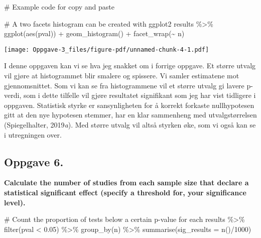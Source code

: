 \documentclass[
  letterpaper,
  DIV=11,
  numbers=noendperiod]{scrreprt}
\newenvironment{Shaded}{\begin{snugshade}}{\end{snugshade}}
\newcommand{\AttributeTok}[1]{\textcolor[rgb]{0.40,0.45,0.13}{#1}}
\newcommand{\CommentTok}[1]{\textcolor[rgb]{0.37,0.37,0.37}{#1}}
\newcommand{\DecValTok}[1]{\textcolor[rgb]{0.68,0.00,0.00}{#1}}
\newcommand{\FloatTok}[1]{\textcolor[rgb]{0.68,0.00,0.00}{#1}}
\newcommand{\FunctionTok}[1]{\textcolor[rgb]{0.28,0.35,0.67}{#1}}
\newcommand{\NormalTok}[1]{\textcolor[rgb]{0.00,0.23,0.31}{#1}}
\newcommand{\SpecialCharTok}[1]{\textcolor[rgb]{0.37,0.37,0.37}{#1}}
\begin{document}
\begin{Shaded}
\begin{Highlighting}[]
\CommentTok{\# Example code for copy and paste}

\CommentTok{\# A two facets histogram can be created with ggplot2}
\NormalTok{results }\SpecialCharTok{\%\textgreater{}\%}
  \FunctionTok{ggplot}\NormalTok{(}\FunctionTok{aes}\NormalTok{(pval)) }\SpecialCharTok{+} 
  \FunctionTok{geom\_histogram}\NormalTok{() }\SpecialCharTok{+}
  \FunctionTok{facet\_wrap}\NormalTok{(}\SpecialCharTok{\textasciitilde{}}\NormalTok{ n)}
\end{Highlighting}
\end{Shaded}

\texttt{[image: Oppgave-3\_files/figure-pdf/unnamed-chunk-4-1.pdf]}

I denne oppgaven kan vi se hva jeg snakket om i forrige oppgave. Et
større utvalg vil gjøre at histogrammet blir smalere og spissere. Vi
samler estimatene mot gjennomsnittet. Som vi kan se fra histogrammene
vil et større utvalg gi lavere p-verdi, som i dette tilfelle vil gjøre
resultatet signifikant som jeg har vist tidligere i oppgaven. Statistisk
styrke er sansynligheten for å korrekt forkaste nullhypotesen gitt at
den nye hypotesen stemmer, har en klar sammenheng med utvalgstørrelsen
(Spiegelhalter, 2019\emph{a}). Med større utvalg vil altså styrken øke,
som vi også kan se i utregningen over.

\subsection{Oppgave 6.}\label{oppgave-6.}

\textbf{Calculate the number of studies from each sample size that
declare a statistical significant effect (specify a threshold for, your
significance level).}

\begin{Shaded}
\begin{Highlighting}[]
\CommentTok{\# Count the proportion of tests below a certain p{-}value for each }
\NormalTok{results }\SpecialCharTok{\%\textgreater{}\%}
  \FunctionTok{filter}\NormalTok{(pval }\SpecialCharTok{\textless{}} \FloatTok{0.05}\NormalTok{) }\SpecialCharTok{\%\textgreater{}\%}
  \FunctionTok{group\_by}\NormalTok{(n) }\SpecialCharTok{\%\textgreater{}\%}
  \FunctionTok{summarise}\NormalTok{(}\AttributeTok{sig\_results =} \FunctionTok{n}\NormalTok{()}\SpecialCharTok{/}\DecValTok{1000}\NormalTok{)}
\end{Highlighting}
\end{Shaded}
\end{document}
